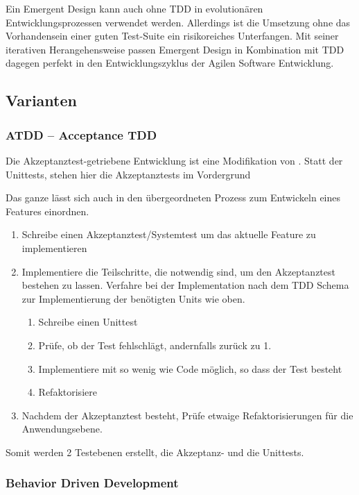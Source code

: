Ein Emergent Design kann auch ohne TDD in evolutionären Entwicklungsprozessen verwendet werden. Allerdings ist die Umsetzung ohne das Vorhandensein einer guten Test-Suite ein risikoreiches Unterfangen.
Mit seiner iterativen Herangehensweise passen Emergent Design in Kombination mit TDD dagegen perfekt in den Entwicklungszyklus der Agilen Software Entwicklung.


\subsection{Varianten}
\subsubsection{ATDD -- Acceptance TDD}
\label{sec:attd}

Die Akzeptanztest-getriebene Entwicklung ist eine Modifikation von . Statt der Unittests, stehen hier die Akzeptanztests im Vordergrund
  
Das ganze lässt sich auch in den übergeordneten Prozess zum Entwickeln eines Features einordnen.
\begin{enumerate}
 \item Schreibe einen Akzeptanztest/Systemtest um das aktuelle Feature zu implementieren
 \item Implementiere die Teilschritte, die notwendig sind, um den Akzeptanztest bestehen zu lassen. Verfahre bei der Implementation nach dem TDD Schema zur Implementierung der benötigten Units wie oben.
  \begin{enumerate}
   \item Schreibe einen Unittest
   \item Prüfe, ob der Test fehlschlägt, andernfalls zurück zu 1.
   \item Implementiere mit so wenig wie Code möglich, so dass der Test besteht
   \item Refaktorisiere
  \end{enumerate}
 \item Nachdem der Akzeptanztest besteht, Prüfe etwaige Refaktorisierungen für die Anwendungsebene.   
\end{enumerate}
  
Somit werden 2 Testebenen erstellt, die Akzeptanz- und die Unittests.


\subsubsection{Behavior Driven Development}
  
